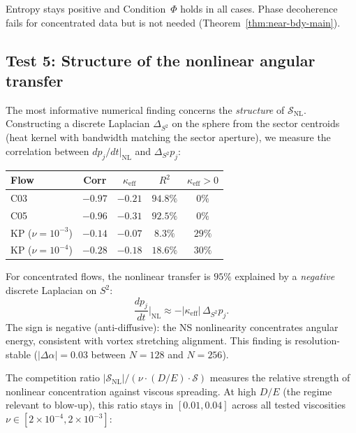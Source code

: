 \documentclass[11pt]{article}
\theoremstyle{definition}
\newcommand{\cS}{\mathcal{S}}
\begin{document}
Entropy stays positive and Condition~$\Phi$ holds in all
cases.  Phase decoherence fails for concentrated data but
is not needed (Theorem~\ref{thm:near-bdy-main}).


\subsection{Test 5: Structure of the nonlinear angular transfer}

The most informative numerical finding concerns the
\emph{structure} of $\cS_{\mathrm{NL}}$.
Constructing a discrete Laplacian $\Delta_{S^2}$ on the
sphere from the sector centroids (heat kernel with
bandwidth matching the sector aperture), we measure the
correlation between $dp_j/dt|_{\mathrm{NL}}$ and
$\Delta_{S^2} p_j$:

\begin{center}
\begin{tabular}{lcccc}
\toprule
\textbf{Flow} & \textbf{Corr} & $\kappa_{\mathrm{eff}}$ &
\textbf{$R^2$} & $\kappa_{\mathrm{eff}} > 0$ \\
\midrule
C03 & $-0.97$ & $-0.21$ & $94.8\%$ & $0\%$ \\
C05 & $-0.96$ & $-0.31$ & $92.5\%$ & $0\%$ \\
KP ($\nu = 10^{-3}$) & $-0.14$ & $-0.07$ & $8.3\%$ & $29\%$ \\
KP ($\nu = 10^{-4}$) & $-0.28$ & $-0.18$ & $18.6\%$ & $30\%$ \\
\bottomrule
\end{tabular}
\end{center}

For concentrated flows, the nonlinear transfer is $95\%$
explained by a \emph{negative} discrete Laplacian on
$S^2$:
\begin{equation}\label{eq:anti-diffusion}
\frac{dp_j}{dt}\bigg|_{\mathrm{NL}}
\approx -|\kappa_{\mathrm{eff}}|\,\Delta_{S^2} p_j.
\end{equation}
The sign is negative (anti-diffusive): the NS nonlinearity
concentrates angular energy, consistent with vortex
stretching alignment.
This finding is resolution-stable
($|\Delta\alpha| = 0.03$ between $N = 128$ and $N = 256$).

The competition ratio
$|\cS_{\mathrm{NL}}|/(\nu\cdot(D/E)\cdot\cS)$ measures
the relative strength of nonlinear concentration against
viscous spreading.  At high $D/E$ (the regime relevant to
blow-up), this ratio stays in $[0.01, 0.04]$ across
all tested viscosities $\nu \in [2\times10^{-4}, 2\times10^{-3}]$:
\end{document}
